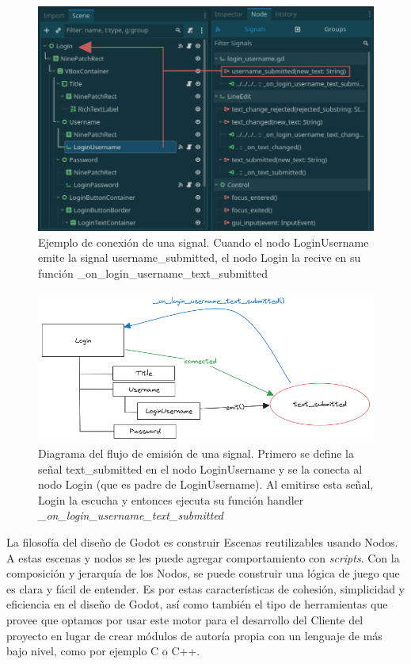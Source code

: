 \begin{figure}[htbp]
    \centering
    \includegraphics[width=1.0\textwidth]{../assets/godot-signals.png}
    \caption{Ejemplo de conexión de una signal. Cuando el nodo LoginUsername emite la signal
            username\_submitted, el nodo Login la recive en su función \_on\_login\_username\_text\_submitted}
    \label{fig:signals-editor}
\end{figure}

\begin{figure}[htbp]
    \centering
    \includegraphics[width=1.0\textwidth]{../assets/godot-signals-diagram.png}
    \caption{Diagrama del flujo de emisión de una signal. Primero se define la señal text\_submitted
            en el nodo LoginUsername y se la conecta al nodo Login (que es padre de LoginUsername).
            Al emitirse esta señal, Login la escucha y entonces ejecuta su función handler
            \textit{\_on\_login\_username\_text\_submitted}}
    \label{fig:signals-diagram}
\end{figure}

La filosofía del diseño de Godot es construir Escenas reutilizables usando Nodos. A estas escenas y 
nodos se les puede agregar comportamiento con \textit{scripts}. Con la composición y jerarquía de los Nodos, 
se puede construir una lógica de juego que es clara y fácil de entender.
Es por estas características de cohesión, simplicidad y eficiencia en el diseño de Godot, así
como también el tipo de herramientas que provee que optamos por usar este motor para el desarrollo del
Cliente del proyecto en lugar de crear módulos de autoría propia con un lenguaje de más bajo nivel, 
como por ejemplo C o C++.

